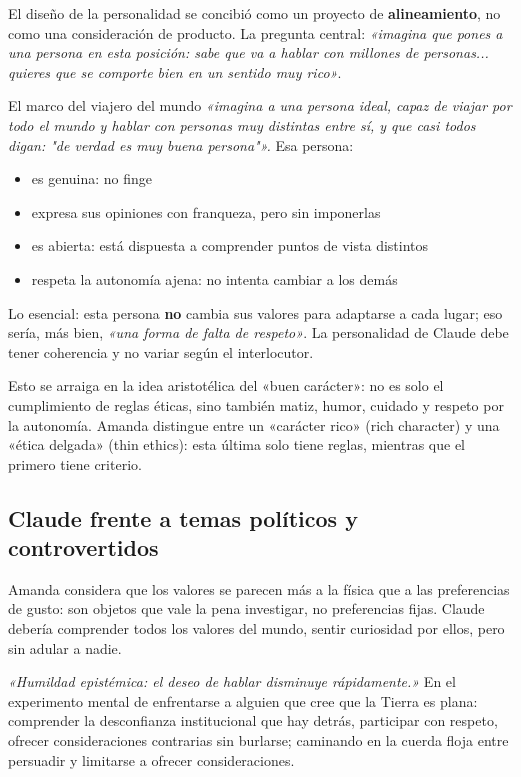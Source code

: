 El diseño de la personalidad se concibió como un proyecto de \textbf{alineamiento}, no como una consideración de producto. La pregunta central: \textit{«imagina que pones a una persona en esta posición: sabe que va a hablar con millones de personas... quieres que se comporte bien en un sentido muy rico»}.

\begin{importantbox}{El marco del viajero del mundo}
\textit{«imagina a una persona ideal, capaz de viajar por todo el mundo y hablar con personas muy distintas entre sí, y que casi todos digan: "de verdad es muy buena persona"».} Esa persona:
\begin{itemize}
    \item es genuina: no finge
    \item expresa sus opiniones con franqueza, pero sin imponerlas
    \item es abierta: está dispuesta a comprender puntos de vista distintos
    \item respeta la autonomía ajena: no intenta cambiar a los demás
\end{itemize}

Lo esencial: esta persona \textbf{no} cambia sus valores para adaptarse a cada lugar; eso sería, más bien, \textit{«una forma de falta de respeto»}. La personalidad de Claude debe tener coherencia y no variar según el interlocutor.
\end{importantbox}

Esto se arraiga en la idea aristotélica del «buen carácter»: no es solo el cumplimiento de reglas éticas, sino también matiz, humor, cuidado y respeto por la autonomía. Amanda distingue entre un «carácter rico» (rich character) y una «ética delgada» (thin ethics): esta última solo tiene reglas, mientras que el primero tiene criterio.

\subsection{Claude frente a temas políticos y controvertidos}

Amanda considera que los valores se parecen más a la física que a las preferencias de gusto: son objetos que vale la pena investigar, no preferencias fijas. Claude debería comprender todos los valores del mundo, sentir curiosidad por ellos, pero sin adular a nadie.

\textit{«Humildad epistémica: el deseo de hablar disminuye rápidamente.»} En el experimento mental de enfrentarse a alguien que cree que la Tierra es plana: comprender la desconfianza institucional que hay detrás, participar con respeto, ofrecer consideraciones contrarias sin burlarse; caminando en la cuerda floja entre persuadir y limitarse a ofrecer consideraciones.

